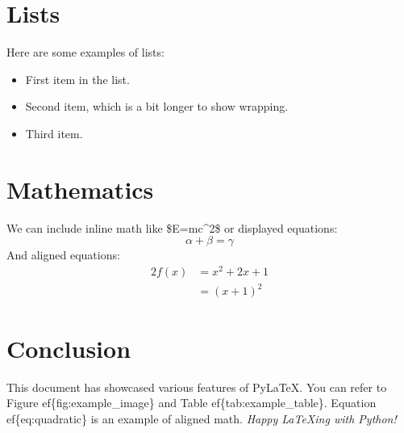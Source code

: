 \documentclass[10pt,a4paper,twocolumn]{article}%
\begin{document}
%
\section{Lists}%
\label{sec:Lists}%
Here are some examples of lists:%
\begin{itemize}%
\item%
First item in the list.%
\item%
Second item, which is a bit longer to show wrapping.%
\item%
Third item.%
\end{itemize}

%
\section{Mathematics}%
\label{sec:Mathematics}%
We can include inline math like \$E=mc\^{}2\$ or displayed equations:%
\[ \alpha + \beta = \gamma \]%
And aligned equations:%
\begin{alignat}{2}%
f(x) &= x^2 + 2x + 1 \\%
     &= (x+1)^2%
\end{alignat}%
\label{eq:quadratic}

%
\section{Conclusion}%
\label{sec:Conclusion}%
This document has showcased various features of PyLaTeX. You can refer to Figure 
ef\{fig:example\_image\} and Table 
ef\{tab:example\_table\}. Equation 
ef\{eq:quadratic\} is an example of aligned math.%
\newline%
\textit{Happy LaTeXing with Python!}

%
\end{document}
